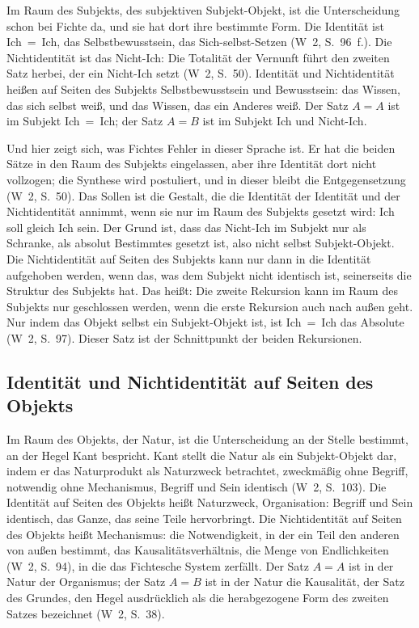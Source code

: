 \documentclass[11pt,a4paper]{article}
\newcommand{\SO}{Subjekt-Objekt}
\newcommand{\Werke}[1]{(W~2, S.~#1)}
\begin{document}
Im Raum des Subjekts, des subjektiven \SO{}, ist die Unterscheidung schon bei Fichte da, und sie hat dort ihre bestimmte Form. Die Identität ist Ich~=~Ich, das Selbstbewusstsein, das Sich-selbst-Setzen \Werke{96~f.}. Die Nichtidentität ist das Nicht-Ich: \glqq Die Totalität der Vernunft führt den zweiten Satz herbei, der ein Nicht-Ich setzt\grqq{} \Werke{50}. Identität und Nichtidentität heißen auf Seiten des Subjekts Selbstbewusstsein und Bewusstsein: das Wissen, das sich selbst weiß, und das Wissen, das ein Anderes weiß. Der Satz $A = A$ ist im Subjekt Ich~=~Ich; der Satz $A = B$ ist im Subjekt Ich und Nicht-Ich.

Und hier zeigt sich, was Fichtes Fehler in dieser Sprache ist. Er hat die beiden Sätze in den Raum des Subjekts eingelassen, aber ihre Identität dort nicht vollzogen; die Synthese wird postuliert, und \glqq in dieser bleibt die Entgegensetzung\grqq{} \Werke{50}. Das Sollen ist die Gestalt, die die Identität der Identität und der Nichtidentität annimmt, wenn sie nur im Raum des Subjekts gesetzt wird: Ich soll gleich Ich sein. Der Grund ist, dass das Nicht-Ich im Subjekt nur als Schranke, als absolut Bestimmtes gesetzt ist, also nicht selbst \SO{}. Die Nichtidentität auf Seiten des Subjekts kann nur dann in die Identität aufgehoben werden, wenn das, was dem Subjekt nicht identisch ist, seinerseits die Struktur des Subjekts hat. Das heißt: Die zweite Rekursion kann im Raum des Subjekts nur geschlossen werden, wenn die erste Rekursion auch nach außen geht. \glqq Nur indem das Objekt selbst ein \SO{} ist, ist Ich~=~Ich das Absolute\grqq{} \Werke{97}. Dieser Satz ist der Schnittpunkt der beiden Rekursionen.

\subsection{Identität und Nichtidentität auf Seiten des Objekts}

Im Raum des Objekts, der Natur, ist die Unterscheidung an der Stelle bestimmt, an der Hegel Kant bespricht. Kant \glqq stellt die Natur als ein \SO{} dar, indem er das Naturprodukt als Naturzweck betrachtet, zweckmäßig ohne Begriff, notwendig ohne Mechanismus, Begriff und Sein identisch\grqq{} \Werke{103}. Die Identität auf Seiten des Objekts heißt Naturzweck, Organisation: Begriff und Sein identisch, das Ganze, das seine Teile hervorbringt. Die Nichtidentität auf Seiten des Objekts heißt Mechanismus: die Notwendigkeit, in der ein Teil den anderen von außen bestimmt, das Kausalitätsverhältnis, die \glqq Menge von Endlichkeiten\grqq{} \Werke{94}, in die das Fichtesche System zerfällt. Der Satz $A = A$ ist in der Natur der Organismus; der Satz $A = B$ ist in der Natur die Kausalität, der Satz des Grundes, den Hegel ausdrücklich als die herabgezogene Form des zweiten Satzes bezeichnet \Werke{38}.
\end{document}
